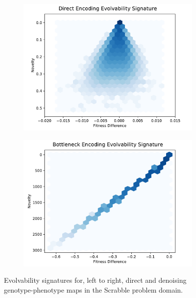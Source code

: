 \begin{figure}
  \begin{subfigure}[b]{0.5\textwidth}
          \includegraphics[width=\linewidth]{img/direct_es_unscaled}
  \end{subfigure}%
  \begin{subfigure}[b]{0.5\textwidth}
          \includegraphics[width=\linewidth]{img/bottleneck_es_unscaled}
  \end{subfigure}%
  \caption{Evolvability signatures for, left to right, direct and denoising genotype-phenotype maps in the Scrabble problem domain.}\label{fig:scrabble_all_es}
\end{figure}
